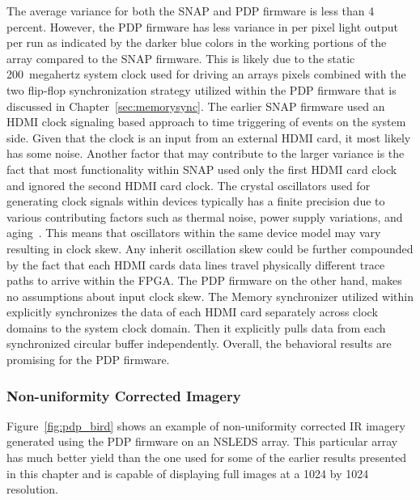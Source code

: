             The average variance for both the SNAP and PDP firmware is less than 4 percent. However, the PDP firmware has less variance in per pixel light output per run as indicated by the darker blue colors in the working portions of the array compared to the SNAP firmware. This is likely due to the static \mbox{200 megahertz} system clock used for driving an arrays pixels combined with the two flip-flop synchronization strategy utilized within the PDP firmware that is discussed in Chapter~\ref{sec:memorysync}. The earlier SNAP firmware used an HDMI clock signaling based approach to time triggering of events on the system side. Given that the clock is an input from an external HDMI card, it most likely has some noise. Another factor that may contribute to the larger variance is the fact that most functionality within SNAP used only the first HDMI card clock and ignored the second HDMI card clock. The crystal oscillators used for generating clock signals within devices typically has a finite precision due to various contributing factors such as thermal noise, power supply variations, and aging~\cite{Naval2002}. This means that oscillators within the same device model may vary resulting in clock skew. Any inherit oscillation skew could be further compounded by the fact that each HDMI cards data lines travel physically different trace paths to arrive within the FPGA. The PDP firmware on the other hand, makes no assumptions about input clock skew. The Memory synchronizer utilized within explicitly synchronizes the data of each HDMI card separately across clock domains to the system clock domain. Then it explicitly pulls data from each synchronized circular buffer independently. Overall, the behavioral results are promising for the PDP firmware.

        \subsubsection{Non-uniformity Corrected Imagery}
            Figure~\ref{fig:pdp_bird} shows an example of non-uniformity corrected IR imagery generated using the PDP firmware on an NSLEDS array. This particular array has much better yield than the one used for some of the earlier results presented in this chapter and is capable of displaying full images at a 1024 by 1024 resolution.

